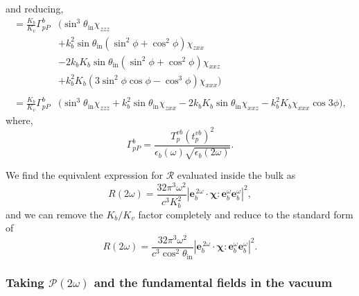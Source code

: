 and reducing,
\begin{equation*}
\begin{split}
=
\frac{K_{b}}{K_{v}}
\Gamma^{b}_{pP}
&\big(
   \sin^{3}\theta_{\mathrm{in}}\chi_{zzz}\\
&+ k^{2}_{b}\sin\theta_{\mathrm{in}}(\sin^{2}\phi + \cos^{2}\phi)\chi_{zxx}\\
&- 2k_{b}K_{b}\sin\theta_{\mathrm{in}}(\sin^{2}\phi + \cos^{2}\phi)\chi_{xxz}\\
&+ k^{2}_{b}K_{b}(3\sin^{2}\phi\cos\phi - \cos^{3}\phi)\chi_{xxx}
\big)\\\\
=
\frac{K_{b}}{K_{v}}
\Gamma^{b}_{pP}
&\big(
  \sin^{3}\theta_{\mathrm{in}}\chi_{zzz} 
+ k^{2}_{b}\sin\theta_{\mathrm{in}}\chi_{zxx}
- 2k_{b}K_{b}\sin\theta_{\mathrm{in}}\chi_{xxz}
- k^{2}_{b}K_{b}\chi_{xxx}\cos3\phi
\big),
\end{split}
\end{equation*}
where,
\begin{equation*}
\Gamma^{b}_{pP} =
\frac{T_{p}^{vb}\left(t^{vb}_{p}\right)^{2}}
     {\epsilon_{b}(\omega)\sqrt{\epsilon_{b}(2\omega)}}.
\end{equation*}

We find the equivalent expression for $\mathcal{R}$ evaluated inside the bulk
as
\begin{equation*}
R(2\omega) =
\frac{32\pi^{3} \omega^{2}}{c^{3}K^{2}_{b}}
\left\vert
\mathbf{e}^{\,2\omega}_{b}\cdot\boldsymbol{\chi}:
\mathbf{e}^{\omega}_{b}\mathbf{e}^{\omega}_{b}
\right\vert^{2} 
,
\end{equation*}
and we can remove the $K_{b}/K_{v}$ factor completely and reduce to the
standard form of
\begin{equation*}
R(2\omega) =
\frac{32\pi^{3} \omega^{2}}{c^{3}\cos^{2}\theta_{\mathrm{in}}}
\left\vert
\mathbf{e}^{\,2\omega}_{b}\cdot\boldsymbol{\chi}:
\mathbf{e}^{\omega}_{b}\mathbf{e}^{\omega}_{b}
\right\vert^{2}.
\end{equation*}


\subsubsection{Taking \texorpdfstring{$\mathcal{P}(2\omega)$}{P(2w)} and the
fundamental fields in the vacuum}

